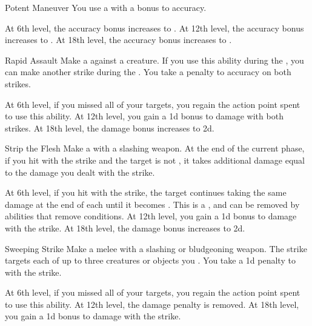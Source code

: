 {            \begin{ability}{Potent Maneuver}
                You use a  with a  bonus to accuracy.

                At 6th level, the accuracy bonus increases to .
                At 12th level, the accuracy bonus increases to .
                At 18th level, the accuracy bonus increases to .
            \end{ability}

            \begin{ability}{Rapid Assault}
                Make a  against a creature.
                If you use this ability during the , you can make another strike during the .
                You take a  penalty to accuracy on both strikes.

                At 6th level, if you missed all of your targets, you regain the action point spent to use this ability.
                At 12th level, you gain a \plus1d bonus to damage with both strikes.
                At 18th level, the damage bonus increases to \plus2d.
            \end{ability}

            \begin{ability}{Strip the Flesh}
                Make a  with a slashing weapon.
                At the end of the current phase, if you hit with the strike and the target is not , it takes additional damage equal to the damage you dealt with the strike.

                At 6th level, if you hit with the strike, the target continues taking the same damage at the end of each  until it becomes .
                This is a , and can be removed by abilities that remove conditions.
                At 12th level, you gain a \plus1d bonus to damage with the strike.
                At 18th level, the damage bonus increases to \plus2d.
            \end{ability}

            \begin{ability}{Sweeping Strike}
                Make a melee  with a slashing or bludgeoning weapon.
                The strike targets each of up to three creatures or objects you .
                You take a \minus1d penalty to  with the strike.

                At 6th level, if you missed all of your targets, you regain the action point spent to use this ability.
                At 12th level, the damage penalty is removed.
                At 18th level, you gain a \plus1d bonus to damage with the strike.
            \end{ability}
        }

